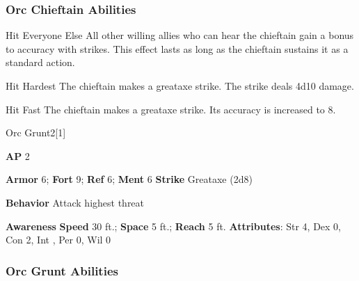 \subsubsection{Orc Chieftain Abilities}

\begin{ability}{Hit Everyone Else}
All other willing allies who can hear the chieftain gain a  bonus to accuracy with strikes.
This effect lasts as long as the chieftain sustains it as a standard action.
\end{ability}

\vspace{0.5em}
\begin{ability}{Hit Hardest}
The chieftain makes a greataxe strike.
The strike deals 4d10 damage.
\end{ability}

\vspace{0.5em}
\begin{ability}{Hit Fast}
The chieftain makes a greataxe strike.
Its accuracy is increased to 8.
\end{ability}






\begin{monsection}{Orc Grunt}{2}[1]
\vspace{-1em}\vspace{-1em}
\begin{spellcontent}
\begin{spelltargetinginfo}
{\textbf{AP} 2}

\pari \textbf{Armor} 6;
\textbf{Fort} 9;
\textbf{Ref} 6;
\textbf{Ment} 6
\pari \textbf{Strike} Greataxe  (2d8)



\pari \textbf{Behavior} Attack highest threat
\end{spelltargetinginfo}
\end{spellcontent}

\begin{monsterfooter}
\pari \textbf{Awareness} 
\pari \textbf{Speed} 30 ft.;
\textbf{Space} 5 ft.;
\textbf{Reach} 5 ft.
\pari \textbf{Attributes}:
Str 4,
Dex 0,
Con 2,
Int ,
Per 0,
Wil 0
\end{monsterfooter}
\end{monsection}


\subsubsection{Orc Grunt Abilities}

